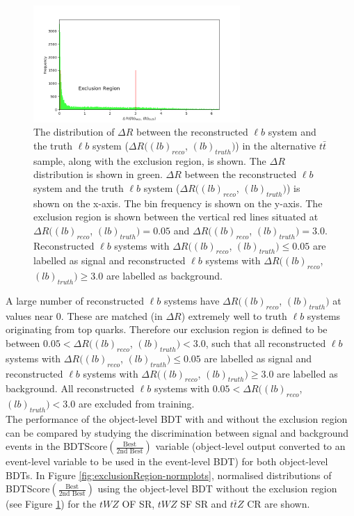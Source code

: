 \begin{figure}[h!]
    \centering
    \includegraphics[width=0.7\textwidth]{figures/DeltaR_lb_bdt.png}
    \caption{The distribution of $\Delta R$ between the reconstructed $\ell b$ system and the truth $\ell b$ system ($\Delta R((lb)_{reco}$, $(lb)_{truth})$) in the alternative $t\bar{t}$ sample, along with the exclusion region, is shown. The $\Delta R$ distribution is shown in green. $\Delta R$ between the reconstructed $\ell b$ system and the truth $\ell b$ system ($\Delta R((lb)_{reco}$, $(lb)_{truth})$) is shown on the x-axis. The bin frequency is shown on the y-axis. The exclusion region is shown between the vertical red lines situated at $\Delta R((lb)_{reco}$, $(lb)_{truth}) = 0.05$ and $\Delta R((lb)_{reco}$, $(lb)_{truth})=3.0$. Reconstructed $\ell b$ systems with $\Delta R((lb)_{reco}$, $(lb)_{truth}) \leq 0.05$ are labelled as signal and reconstructed $\ell b$ systems with $\Delta R((lb)_{reco}$, $(lb)_{truth}) \geq 3.0$ are labelled as background. }
    \label{fig:exclusionRegion}
\end{figure}

A large number of reconstructed $\ell b$ systems have $\Delta R((lb)_{reco}$, $(lb)_{truth})$ at values near $0$. These are matched (in $\Delta R$) extremely well to truth $\ell b$ systems originating from top quarks. Therefore our exclusion region is defined to be between $0.05 < \Delta R((lb)_{reco}$, $(lb)_{truth}) < 3.0$, such that all reconstructed $\ell b$ systems with $\Delta R((lb)_{reco}$, $(lb)_{truth}) \leq 0.05$ are labelled as signal and reconstructed $\ell b$ systems with $\Delta R((lb)_{reco}$, $(lb)_{truth}) \geq 3.0$ are labelled as background. All reconstructed $\ell b$ systems with $0.05 < \Delta R((lb)_{reco}$, $(lb)_{truth}) < 3.0$ are excluded from training.\\

The performance of the object-level BDT with and without the exclusion region can be compared by studying the discrimination between signal and background events in the BDTScore$(\frac{\text{Best}}{\text{2nd Best}})$ variable (object-level output converted to an event-level variable to be used in the event-level BDT) for both object-level BDTs. In Figure \ref{fig:exclusionRegion-normplots}, normalised distributions of BDTScore$(\frac{\text{Best}}{\text{2nd Best}})$ using the object-level BDT without the exclusion region (see Figure \ref{fig:exclusionRegion}) for the $tWZ$ OF SR, $tWZ$ SF SR and $t\bar{t}Z$ CR are shown.


